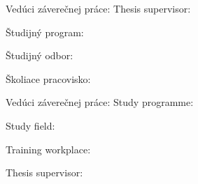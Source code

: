

\ifx\FIITlagEN\undefined
	Vedúci záverečnej práce: \FIITsupervisor
\else
	Thesis supervisor: \FIITsupervisor
\fi

\medskip{}

\ifx\FIITlagEN\undefined
	\FIITdateSK
\else
	\FIITdate
\fi

\emptypage







\ifx\FIITlagEN\undefined
	Študijný program: \FIITstudyProgramSK

	Študijný odbor: \FIITdegreeCourseSK

	Školiace pracovisko: \FIITinstituteSK

	Vedúci záverečnej práce: \FIITsupervisor
\else
	Study programme: \FIITstudyProgram

	Study field: \FIITstudyField

	Training workplace: \FIITinstitute

	Thesis supervisor: \FIITsupervisor
\fi

\medskip{}

\ifx\FIITlagEN\undefined
	\FIITdateSK
\else
	\FIITdate
\fi

\emptypage
